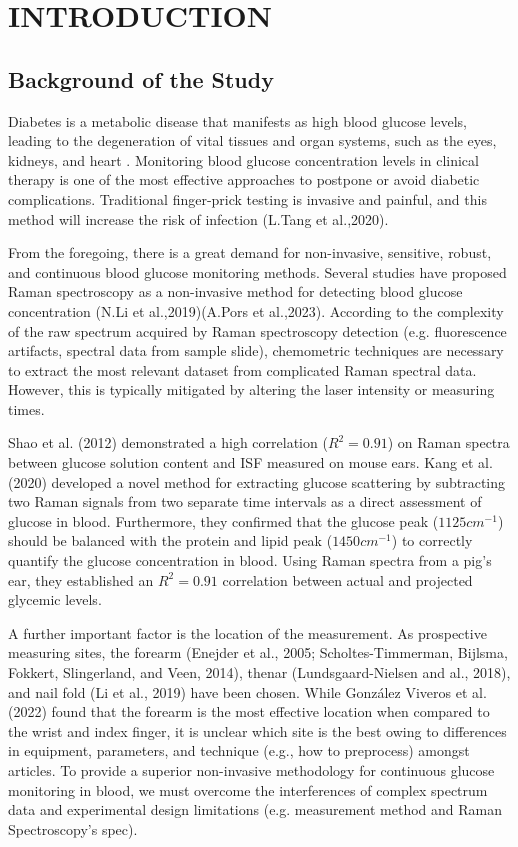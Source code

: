 \chapter{INTRODUCTION} 

\section{Background of the Study}

Diabetes is a metabolic disease that manifests as high blood glucose levels, leading to the degeneration of vital tissues and organ systems, such as the eyes, kidneys, and heart \cite{AB,reichert2021diabetes}. 
Monitoring blood glucose concentration levels in clinical therapy is one of the most effective approaches to postpone or avoid diabetic complications. 
Traditional finger-prick testing is invasive and painful, and this method will increase the risk of infection (L.Tang et al.,2020). 

From the foregoing, there is a great demand for non-invasive, sensitive, robust, and continuous blood glucose monitoring methods. 
Several studies have proposed Raman spectroscopy as a non-invasive method for detecting blood glucose concentration (N.Li et al.,2019)(A.Pors et al.,2023). 
According to the complexity of the raw spectrum acquired by Raman spectroscopy detection (e.g. fluorescence artifacts, spectral data from sample slide), chemometric techniques are necessary to extract the most relevant dataset from complicated Raman spectral data. 
However, this is typically mitigated by altering the laser intensity or measuring times.

Shao et al. (2012) demonstrated a high correlation ($R^2 = 0.91$) on Raman spectra between glucose solution content and ISF measured on mouse ears. 
Kang et al. (2020) developed a novel method for extracting glucose scattering by subtracting two Raman signals from two separate time intervals as a direct assessment of glucose in blood. 
Furthermore, they confirmed that the glucose peak ($1125cm^{-1}$) should be balanced with the protein and lipid peak ($1450cm^{-1}$) to correctly quantify the glucose concentration in blood. 
Using Raman spectra from a pig's ear, they established an $R^2 = 0.91$ correlation between actual and projected glycemic levels.

A further important factor is the location of the measurement. 
As prospective measuring sites, the forearm (Enejder et al., 2005; Scholtes-Timmerman, Bijlsma, Fokkert, Slingerland, and Veen, 2014), thenar (Lundsgaard-Nielsen and al., 2018), and nail fold (Li et al., 2019) have been chosen. 
While González Viveros et al. (2022) found that the forearm is the most effective location when compared to the wrist and index finger, it is unclear which site is the best owing to differences in equipment, parameters, and technique (e.g., how to preprocess) amongst articles. 
To provide a superior non-invasive methodology for continuous glucose monitoring in blood, we must overcome the interferences of complex spectrum data and experimental design limitations (e.g. measurement method and Raman Spectroscopy's spec).

